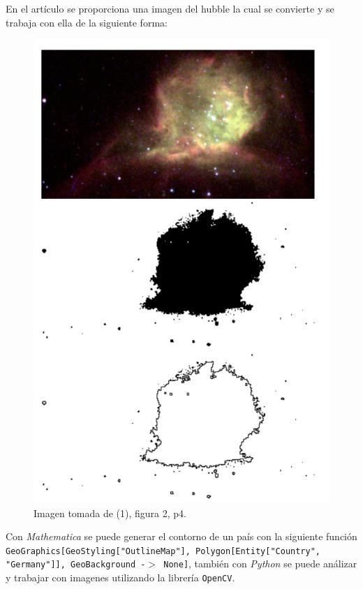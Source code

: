 \begin{multicols}{2}


En el artículo se proporciona una imagen del hubble la cual se convierte y se trabaja con ella de la siguiente forma:

\begin{figure}[H]
	\centering
	\includegraphics[scale=0.2]{./img/coso.png}
	\caption{Imagen tomada de (1), figura 2, p4.}
\end{figure}

\columnbreak

Con \textit{Mathematica} se puede generar el contorno de un país con la siguiente función \texttt{GeoGraphics[{GeoStyling["OutlineMap"], Polygon[Entity["Country", "Germany"]]}, GeoBackground -$>$ None]}, también con \textit{Python} se puede análizar y trabajar con imagenes utilizando la librería \texttt{OpenCV}.




\end{multicols}
